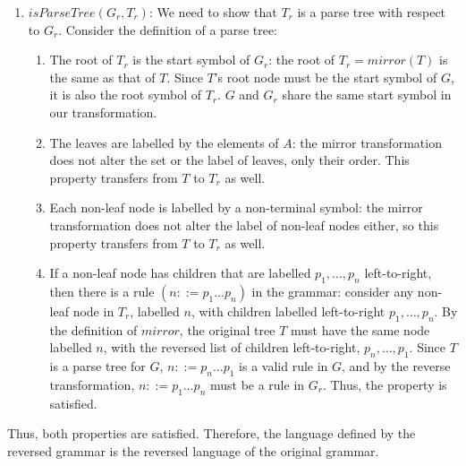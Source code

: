 \begin{exercise}{}
\begin{solution}
\begin{enumerate}
      \item \(isParseTree(G_r, T_r)\): We need to show that \(T_r\) is a parse
      tree with respect to \(G_r\). Consider the definition of a parse tree:
      \begin{enumerate}
        \item The root of \(T_r\) is the start symbol of \(G_r\): the root of
        \(T_r = mirror(T)\) is the same as that of \(T\). Since \(T\)'s root
        node must be the start symbol of \(G\), it is also the root symbol of
        \(T_r\). \(G\) and \(G_r\) share the same start symbol in our
        transformation.
        \item The leaves are labelled by the elements of \(A\): the mirror
        transformation does not alter the set or the label of leaves, only their
        order. This property transfers from \(T\) to \(T_r\) as well.
        \item Each non-leaf node is labelled by a non-terminal symbol: the
        mirror transformation does not alter the label of non-leaf nodes either,
        so this property transfers from \(T\) to \(T_r\) as well.
        \item If a non-leaf node has children that are labelled \(p_1, \ldots,
        p_n\) left-to-right, then there is a rule \((n ::= p_1 \ldots p_n)\) in
        the grammar: consider any non-leaf node in \(T_r\), labelled \(n\), with
        children labelled left-to-right \(p_1, \ldots, p_n\). By the definition
        of \(mirror\), the original tree \(T\) must have the same node labelled
        \(n\), with the reversed list of children left-to-right, \(p_n, \ldots,
        p_1\). Since \(T\) is a parse tree for \(G\), \(n ::= p_n \ldots p_1\)
        is a valid rule in \(G\), and by the reverse transformation, \(n ::= p_1
        \ldots p_n\) must be a rule in \(G_r\). Thus, the property is satisfied.
      \end{enumerate}
    \end{enumerate}

    Thus, both properties are satisfied. Therefore, the language defined by the
    reversed grammar is the reversed language of the original grammar.

  \end{solution}

\end{exercise}

